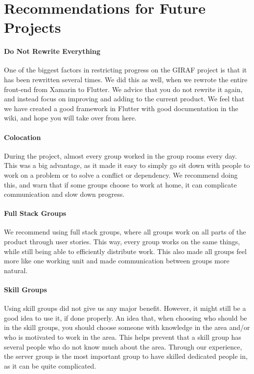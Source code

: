 \chapter{Recommendations for Future Projects}
\subsubsection{Do Not Rewrite Everything}
One of the biggest factors in restricting progress on the GIRAF project is that it has been rewritten several times. We did this as well, when we rewrote the entire front-end from Xamarin to Flutter. We advice that you do not rewrite it again, and instead focus on improving and adding to the current product. We feel that we have created a good framework in Flutter with good documentation in the wiki, and hope you will take over from here.

\subsubsection{Colocation}
During the project, almost every group worked in the group rooms every day. This was a big advantage, as it made it easy to simply go sit down with people to work on a problem or to solve a conflict or dependency. We recommend doing this, and warn that if some groups choose to work at home, it can complicate communication and slow down progress.

\subsubsection{Full Stack Groups}
We recommend using full stack groups, where all groups work on all parts of the product through user stories. This way, every group works on the same things, while still being able to efficiently distribute work. This also made all groups feel more like one working unit and made communication between groups more natural. 

\subsubsection{Skill Groups}
Using skill groups did not give us any major benefit. However, it might still be a good idea to use it, if done properly. An idea that, when choosing who should be in the skill groups, you should choose someone with knowledge in the area and/or who is motivated to work in the area. This helps prevent that a skill group has several people who do not know much about the area.
Through our experience, the server group is the most important group to have skilled dedicated people in, as it can be quite complicated. 

